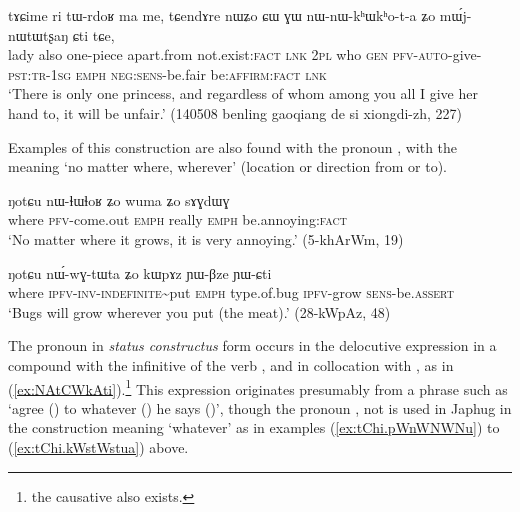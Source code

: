 \begin{exe}
\ex \label{ex:CW.GW.nWnWkhWkhota}
\gll tɤɕime ri tɯ-rdoʁ ma me, tɕendɤre nɯʑo ɕɯ ɣɯ nɯ-nɯ-kʰɯ\redp{}kʰo-t-a ʑo mɯ́j-nɯtɯtʂaŋ ɕti tɕe, \\
lady also one-piece apart.from not.exist:\textsc{fact} \textsc{lnk} \textsc{2pl} who \textsc{gen} \textsc{pfv}-\textsc{auto}-give-\textsc{pst:tr-1sg} \textsc{emph} \textsc{neg:sens}-be.fair be:\textsc{affirm:fact} \textsc{lnk} \\
\glt `There is only one princess, and regardless of whom among you all I give her hand to, it will be unfair.' (140508 benling gaoqiang de si xiongdi-zh, 227)
\end{exe}

Examples of this construction are also found with the pronoun , with the meaning `no matter where, wherever' (location or direction from or to).

\begin{exe}
\ex \label{ex:NotCu.nWnWlhWlhoR}
\gll ŋotɕu nɯ-ɬɯ\redp{}ɬoʁ ʑo wuma ʑo sɤɣdɯɣ \\
where \textsc{pfv}-come.out \textsc{emph} really \textsc{emph} be.annoying:\textsc{fact} \\
\glt `No matter where it grows, it is very annoying.' (5-khArWm, 19)
\end{exe}

\begin{exe}
\ex \label{ex:nWGtWta}
\gll 
ŋotɕu 	nɯ́-wɣ-tɯ\redp{}ta 	ʑo 	kɯpɤz 	ɲɯ-βze 	ɲɯ-ɕti\\
 where \textsc{ipfv-inv}-\textsc{indefinite}\textasciitilde{}put \textsc{emph} type.of.bug \textsc{ipfv}-grow \textsc{sens}-be.\textsc{assert}\\
\glt `Bugs will grow wherever you put (the meat).' (28-kWpAz, 48)
\end{exe}
 
 The pronoun  in \textit{status constructus} form  occurs in the delocutive expression  in a compound with the infinitive  of the verb , and in collocation with , as in (\ref{ex:NAtCWkAti}).\footnote{the causative  also exists.} 
This expression originates presumably from a phrase such as `agree () to whatever () he says ()', though the pronoun , not  is used in Japhug in the construction meaning `whatever' as in examples (\ref{ex:tChi.pWnWNWNu}) to (\ref{ex:tChi.kWstWstua}) above.

